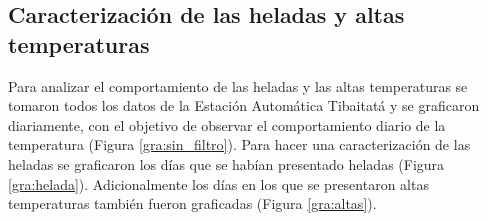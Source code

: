 \subsection{Caracterización de las heladas y altas temperaturas}
\label{area_caracterizacion_heladas_extremas}

Para analizar el comportamiento de las heladas y las altas temperaturas se tomaron todos los datos de la Estación Automática Tibaitatá y se graficaron diariamente, con el objetivo de observar el comportamiento diario de la temperatura (Figura \ref{gra:sin_filtro}). Para hacer una caracterización de las heladas se graficaron los días que se habían presentado heladas (Figura \ref{gra:helada}). Adicionalmente los días en los que se presentaron altas temperaturas también fueron graficadas (Figura \ref{gra:altas}).


